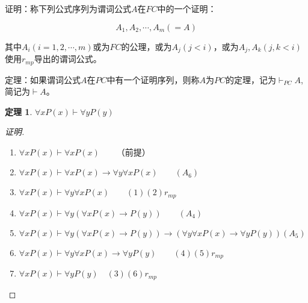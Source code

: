 \documentclass{article}
\newtheorem{Thm}{定理}
\begin{document}
\begin{CJK*}{UTF8}{gbsn}
    证明：称下列公式序列为谓词公式$A$在$FC$中的一个证明：

    \[A_1,A_2,\cdots,A_m(=A)\]

    其中$A_i(i=1,2,\cdots,m)$或为$FC$的公理，或为$A_j(j<i)$，或为$A_j,A_k(j,k<i)$使用$r_{mp}$导出的谓词公式。


    定理：如果谓词公式$A$在$PC$中有一个证明序列，则称$A$为$PC$的定理，记为$\vdash_{PC}A$,简记为$\vdash A$。


  \begin{Thm}$\forall xP(x)\vdash \forall yP(y)$
  \end{Thm}
  \begin{proof}[证明]$\quad$
    \begin{enumerate}
      \item $ \forall x P(x)\vdash \forall xP(x) \quad\quad $（前提）
      \item $ \forall x P(x)\vdash \forall xP(x)\to \forall y\forall xP(x) \quad\quad (A_6)$
      \item $ \forall x P(x)\vdash \forall y\forall xP(x) \quad\quad (1)(2)r_{mp}$ 
      \item $ \forall x P(x)\vdash \forall y(\forall xP(x)\to P(y))\quad\quad (A_4)$
      \item  $\forall x P(x)\vdash \forall y(\forall xP(x)\to P(y))\to (\forall y\forall xP(x)\to \forall yP(y))(A_5)$
      \item  $\forall x P(x)\vdash \forall y\forall xP(x)\to \forall yP(y)\quad\quad(4)(5)r_{mp}$
      \item $\forall xP(x)\vdash \forall yP(y)\quad (3)(6)r_{mp}$
    \end{enumerate}
  \end{proof}
  
\end{CJK*}
\end{document}
